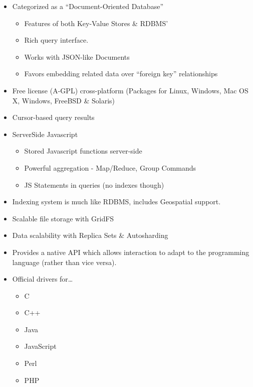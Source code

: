 \documentclass{beamer}
\newenvironment{itemizeframe}
               {\begin{frame}\startitemizeframe} 
               {\stopitemizeframe\end{frame}}
\newcommand\startitemizeframe{\begin{itemize}} \newcommand\stopitemizeframe{\end{itemize}}
\begin{document}
\begin{itemizeframe}
\begin{itemizeframe}
\frametitle{Introducing MongoDB}
    \item Categorized as a ``Document-Oriented Database''
        \begin{itemize}
            \item<2-> Features of both Key-Value Stores \& RDBMS'
            \item<2-> Rich query interface.
            \item<2-> Works with JSON-like Documents
            \item<2-> Favors embedding related data over ``foreign key'' relationships
        \end{itemize}
    \item<3-> Free license (A-GPL) cross-platform (Packages for Linux, Windows, Mac OS X, Windows, FreeBSD \& Solaris)
    \item<4-> Cursor-based query results 
    \item<5-> ServerSide Javascript
        \begin{itemize}
            \item<5-> Stored Javascript functions server-side
            \item<5-> Powerful aggregation - Map/Reduce, Group Commands
            \item<5-> JS Statements in queries (no indexes though)
        \end{itemize}
    \item<6-> Indexing system is much like RDBMS, includes Geospatial support.
    \item<7-> Scalable file storage with GridFS
    \item<8-> Data scalability with Replica Sets \& Autosharding
\end{itemizeframe}
\begin{itemizeframe}
\frametitle{Programming with MongoDB}
\item Provides a native API which allows interaction to adapt to the programming language (rather than vice versa).
\item<2-> Official drivers for\ldots
    \begin{itemize}
        \item<2-> C
        \item<2-> C++
        \item<2-> Java
        \item<2-> JavaScript
        \item<2-> Perl
        \item<2-> PHP

\end{itemize}
\end{itemizeframe}
\end{itemizeframe}
\end{document}

